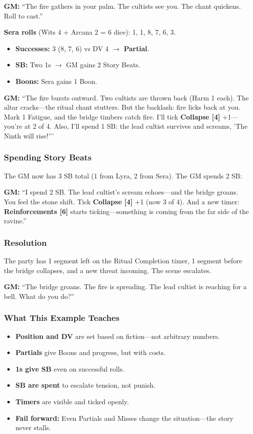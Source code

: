 \textbf{GM:} ``The fire gathers in your palm. The cultists see you. The chant quickens. Roll to cast.''

\textbf{Sera rolls} (Wits 4 + Arcana 2 = 6 dice): 1, 1, 8, 7, 6, 3.

\begin{itemize}
  \item \textbf{Successes:} 3 (8, 7, 6) vs DV 4 $\rightarrow$ \textbf{Partial}.
  \item \textbf{SB:} Two 1s $\rightarrow$ GM gains 2 Story Beats.
  \item \textbf{Boons:} Sera gains 1 Boon.
\end{itemize}

\textbf{GM:} ``The fire bursts outward. Two cultists are thrown back (Harm 1 each). The altar cracks---the ritual chant stutters. But the backlash: fire licks back at you. Mark 1 Fatigue, and the bridge timbers catch fire. I'll tick \textbf{Collapse [4]} +1---you're at 2 of 4. Also, I'll spend 1 SB: the lead cultist survives and screams, 'The Ninth will rise!'''

\subsubsection{Spending Story Beats}

The GM now has 3 SB total (1 from Lyra, 2 from Sera). The GM spends 2 SB:

\textbf{GM:} ``I spend 2 SB. The lead cultist's scream echoes---and the bridge groans. You feel the stone shift. Tick \textbf{Collapse [4]} +1 (now 3 of 4). And a new timer: \textbf{Reinforcements [6]} starts ticking---something is coming from the far side of the ravine.''

\subsubsection{Resolution}

The party has 1 segment left on the Ritual Completion timer, 1 segment before the bridge collapses, and a new threat incoming. The scene escalates.

\textbf{GM:} ``The bridge groans. The fire is spreading. The lead cultist is reaching for a bell. What do you do?''

\subsubsection{What This Example Teaches}

\begin{itemize}
  \item \textbf{Position and DV} are set based on fiction---not arbitrary numbers.
  \item \textbf{Partials} give Boons and progress, but with costs.
  \item \textbf{1s give SB} even on successful rolls.
  \item \textbf{SB are spent} to escalate tension, not punish.
  \item \textbf{Timers} are visible and ticked openly.
  \item \textbf{Fail forward:} Even Partials and Misses change the situation---the story never stalls.
\end{itemize}